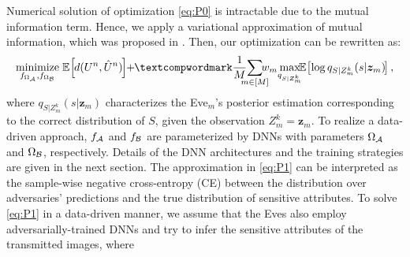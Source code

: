 \documentclass[conference]{IEEEtran}
\begin{document}
Numerical solution of optimization \eqref{eq:P0}   is intractable due to the mutual information term.  Hence, we apply a variational approximation of mutual information, which was proposed in \cite{MI-approx}. Then, our optimization can be rewritten as:‌ 
	\begin{align}\label{eq:P1}
		\underset{f_{\Omega_{\cal A}},
			f_{\Omega_{\cal B}}}{\text{minimize}} \quad  \hspace{-2.5mm}\mathbb{E}\hspace{-0.5mm}\left[\hspace{-0.3mm}d(U^n,\hat{U}^n)\hspace{-0.3mm}\right] \hspace{-1mm} + \hspace{-1mm}‌
		\frac{1}{M}	\hspace{-2.5mm} \sum_{m \in [M]}  \hspace{-3mm}
		w_m
		\underset{q_{S|Z_m^k}}{\text{max}}\hspace{0mm}
		\hspace{-1mm}\mathbb{E}\hspace{-0.5mm}\left[\log q_{S|Z^{k}_{m}}(s|{\boldsymbol z}_m)\hspace{-0.5mm}\right],  
	\end{align} 
	where $q_{S|Z^k_m}(s|{\boldsymbol z}_m)$ characterizes the  
	Eve$_{m}$'s posterior  estimation corresponding to the correct
	distribution of $S$, 
	given the observation $Z^k_m = {\boldsymbol z}_m$. 	
To realize a data-driven approach,  $f_{\cal A}$ and $f_{\cal B}$ are parameterized by DNNs with parameters $\Omega_{\cal A}$ and $\Omega_{\cal B}$, respectively.  
Details of the DNN architectures and the  training strategies  are given in the next section.     
	The approximation  in \eqref{eq:P1} can be interpreted as the sample-wise negative  cross-entropy (CE)  between the distribution over  adversaries' predictions and the true 
	distribution of sensitive attributes. 
	To solve \eqref{eq:P1} in a data-driven manner, we assume that the 
	Eves also employ  adversarially-trained DNNs and try  to infer the sensitive attributes of the transmitted images, where  
\end{document}
